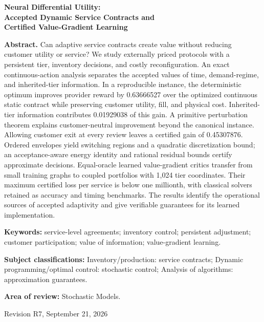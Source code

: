 \documentclass[11pt,letterpaper]{article}
\theoremstyle{definition}
\newcommand{\1}{\mathbf 1}
\begin{document}
\begin{titlepage}\centering
{\Large\bfseries Neural Differential Utility:\\ Accepted Dynamic Service Contracts and\\ Certified Value-Gradient Learning\par}
\vspace{.3in}{Anonymous manuscript for Operations Research\par}\vspace{.25in}
\begin{minipage}{\textwidth}
\textbf{Abstract.}
Can adaptive service contracts create value without reducing customer utility or service? We study externally priced protocols with a persistent tier, inventory decisions, and costly reconfiguration. An exact continuous-action analysis separates the accepted values of time, demand-regime, and inherited-tier information. In a reproducible instance, the deterministic optimum improves provider reward by 0.63666527 over the optimized continuous static contract while preserving customer utility, fill, and physical cost. Inherited-tier information contributes 0.01929038 of this gain. A primitive perturbation theorem explains customer-neutral improvement beyond the canonical instance. Allowing customer exit at every review leaves a certified gain of 0.45307876. Ordered envelopes yield switching regions and a quadratic discretization bound; an acceptance-aware energy identity and rational residual bounds certify approximate decisions. Equal-oracle learned value-gradient critics transfer from small training graphs to coupled portfolios with 1,024 tier coordinates. Their maximum certified loss per service is below one millionth, with classical solvers retained as accuracy and timing benchmarks. The results identify the operational sources of accepted adaptivity and give verifiable guarantees for its learned implementation.
\par\vspace{.16in}\textbf{Keywords:} service-level agreements; inventory control; persistent adjustment; customer participation; value of information; value-gradient learning.
\par\vspace{.10in}\textbf{Subject classifications:} Inventory/production: service contracts; Dynamic programming/optimal control: stochastic control; Analysis of algorithms: approximation guarantees.
\par\vspace{.10in}\textbf{Area of review:} Stochastic Models.
\end{minipage}\vfill{Revision R7, September 21, 2026\par}\end{titlepage}
\end{document}
